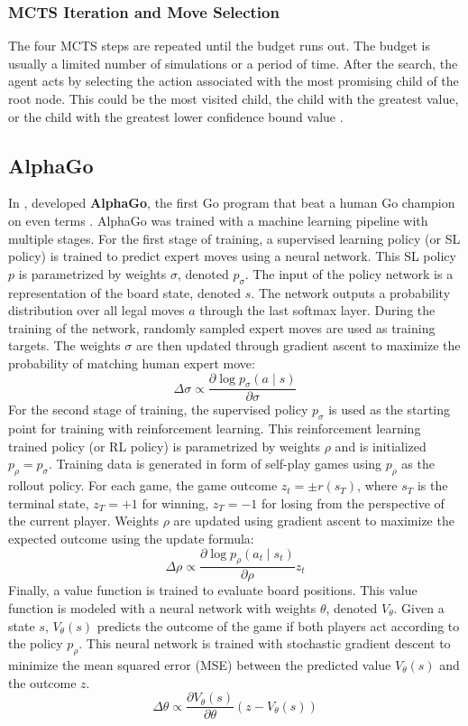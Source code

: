 \subsubsection{MCTS Iteration and Move Selection}
The four MCTS steps are repeated until the budget runs out.
The budget is usually a limited number of simulations or a period of time.
After the search, the agent acts by selecting the action associated with the most promising child of the root node.
This could be the most visited child, the child with the greatest value, or the child with the greatest lower confidence bound value \cite{FreshMaxLcb_RoyJonathan_2019,AcceleratingSelfPlayLearning_Wu_2020}.

\subsection{AlphaGo} \label{sec:alpha_go}
In \citeyear{MasteringGameGo_Silver.Schrittwieser.ea_2017},
\citeauthor{MasteringGameGo_Silver.Schrittwieser.ea_2017} developed \textbf{AlphaGo},
the first Go program that beat a human Go champion on even terms \cite{MasteringGameGo_Silver.Schrittwieser.ea_2017}.
AlphaGo was trained with a machine learning pipeline with multiple stages.
For the first stage of training, a supervised learning policy (or SL policy) is trained to predict expert moves using a neural network.
This SL policy $p$ is parametrized by weights $\sigma$, denoted $p_{\sigma}$.
The input of the policy network is a representation of the board state, denoted $s$.
The network outputs a probability distribution over all legal moves $a$ through the last softmax layer.
During the training of the network, randomly sampled expert moves are used as training targets.
The weights $\sigma$ are then updated through gradient ascent to maximize the probability of matching human expert move:
$$
    \Delta \sigma \propto \frac{\partial \log p_{\sigma}(a \mid s)}{\partial \sigma}
$$
For the second stage of training, the supervised policy $p_{\sigma}$ is used as the starting point for training with reinforcement learning.
This reinforcement learning trained policy (or RL policy) is parametrized by weights $\rho$ and is initialized $p_{\rho} = p_{\sigma}$.
Training data is generated in form of self-play games using $p_{\rho}$ as the rollout policy.
For each game, the game outcome $z_t = \pm r(s_T)$, where $s_T$ is the terminal state, $z_T = +1$ for winning, $z_T = -1$ for losing from the perspective of the current player.
Weights $\rho$ are updated using gradient ascent to maximize the expected outcome using the update formula:
$$
    \Delta \rho \propto \frac{\partial \log p_{\rho}\left(a_{t} \mid s_{t}\right)}{\partial \rho} z_{t}
$$
Finally, a value function is trained to evaluate board positions.
This value function is modeled with a neural network with weights $\theta$, denoted $V_{\theta}$.
Given a state $s$, $V_{\theta}(s)$ predicts the outcome of the game if both players act according to the policy $p_{\rho}$.
This neural network is trained with stochastic gradient descent to minimize the mean squared error (MSE) between the predicted value $V_{\theta}(s)$ and the outcome $z$.
$$
    \Delta \theta \propto \frac{\partial V_{\theta}(s)}{\partial \theta}\left(z-V_{\theta}(s)\right)
$$


